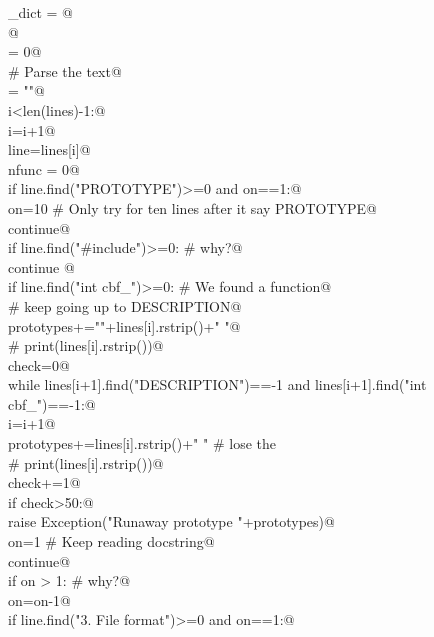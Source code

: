 \documentclass[10pt,a4paper,twoside,notitlepage]{article}
\begin{document}
\begin{flushleft}
\begin{minipage}{\linewidth}
\begin{list}{}{}
\mbox{}\verb@name_dict = {}@\\
\mbox{}@\\
\mbox{}\verb@debug = 0@\\
\mbox{}\verb@# Parse the text@\\
\mbox{}\verb@prototypes = ""@\\
\mbox{}\verb@while i<len(lines)-1:@\\
\mbox{}\verb@   i=i+1@\\
\mbox{}\verb@   line=lines[i]@\\
\mbox{}\verb@   nfunc = 0@\\
\mbox{}\verb@   if line.find("PROTOTYPE")>=0 and on==1:@\\
\mbox{}\verb@      on=10 # Only try for ten lines after it say PROTOTYPE@\\
\mbox{}\verb@      continue@\\
\mbox{}\verb@   if line.find("#include")>=0: # why?@\\
\mbox{}\verb@      continue @\\
\mbox{}\verb@   if line.find("int cbf_")>=0: # We found a function@\\
\mbox{}\verb@      # keep going up to DESCRIPTION@\\
\mbox{}\verb@      prototypes+=""+lines[i].rstrip()+" "@\\
\mbox{}\verb@      # print(lines[i].rstrip())@\\
\mbox{}\verb@      check=0@\\
\mbox{}\verb@      while lines[i+1].find("DESCRIPTION")==-1 and lines[i+1].find("int cbf_")==-1:@\\
\mbox{}\verb@         i=i+1@\\
\mbox{}\verb@         prototypes+=lines[i].rstrip()+" " # lose the \n@\\
\mbox{}\verb@         # print(lines[i].rstrip())@\\
\mbox{}\verb@         check+=1@\\
\mbox{}\verb@         if check>50:@\\
\mbox{}\verb@            raise Exception("Runaway prototype "+prototypes)@\\
\mbox{}\verb@      on=1 # Keep reading docstring@\\
\mbox{}\verb@      continue@\\
\mbox{}\verb@   if on > 1: # why?@\\
\mbox{}\verb@      on=on-1@\\
\mbox{}\verb@   if line.find("3. File format")>=0 and on==1:@\\

\end{list}
\end{minipage}
\end{flushleft}
\end{document}
